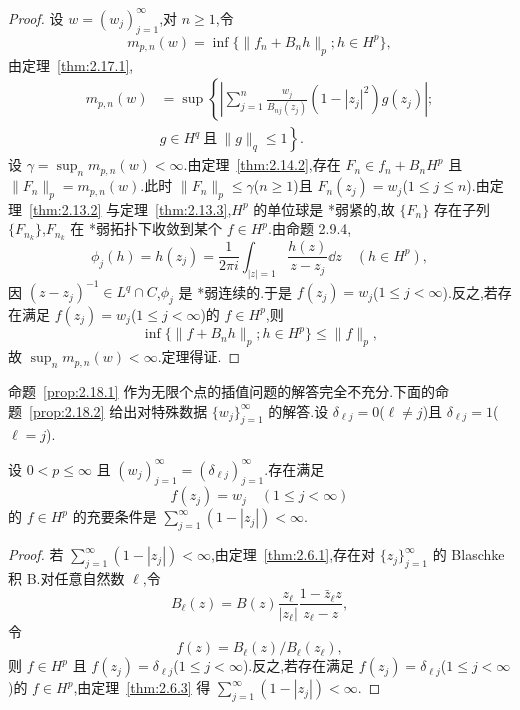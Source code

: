 \begin{proof}
设 $w = (w_{j})_{j=1}^{\infty}$,对 $n \geq 1$,令
\begin{equation*}
m_{p,n}(w) = \inf \{\|f_{n} + B_{n}h\|_{p}; h \in H^{p}\},
\end{equation*}
由定理~\ref{thm:2.17.1},
\begin{align*}
m_{p,n}(w) &= \sup \left\{\left| \sum_{j=1}^{n} \frac{w_{j}}{B_{nj}(z_{j})}(1 - |z_{j}|^{2}) g(z_{j}) \right|; \right. \\
& \left. g \in H^{q} \ \text{且} \ \|g\|_{q} \leq 1 \right\}.
\end{align*}
设 $\gamma = \sup_{n}m_{p,n}(w) < \infty$.由定理~\ref{thm:2.14.2},存在 $F_{n} \in f_{n} + B_{n}H^{p}$ 且 $\|F_{n}\|_{p} = m_{p,n}(w)$.此时 $\|F_{n}\|_{p} \leq \gamma$($n \geq 1$)且 $F_{n}(z_{j}) = w_{j}$($1 \leq j \leq n$).由定理~\ref{thm:2.13.2} 与定理~\ref{thm:2.13.3},$H^{p}$ 的单位球是 *弱紧的,故 $\{F_{n}\}$ 存在子列 $\{F_{n_{k}}\}$,$F_{n_{k}}$ 在 *弱拓扑下收敛到某个 $f \in H^{p}$.由命题 2.9.4,
\begin{equation*}
\phi_{j}(h) = h(z_{j}) = \frac{1}{2\pi i}\int_{|z|=1} \frac{h(z)}{z - z_{j}}\dd z \quad (h \in H^{p}),
\end{equation*}
因 $(z - z_{j})^{-1} \in L^{q} \cap C$,$\phi_{j}$ 是 *弱连续的.于是 $f(z_{j}) = w_{j}$($1 \leq j < \infty$).反之,若存在满足 $f(z_{j}) = w_{j}$($1 \leq j < \infty$)的 $f \in H^{p}$,则
\begin{equation*}
\inf \{\|f + B_{n}h\|_{p}; h \in H^{p}\} \leq \|f\|_{p},
\end{equation*}
故 $\sup_{n}m_{p,n}(w) < \infty$.定理得证.
\end{proof}

命题~\ref{prop:2.18.1} 作为无限个点的插值问题的解答完全不充分.下面的命题~\ref{prop:2.18.2} 给出对特殊数据 $\{w_{j}\}_{j=1}^{\infty}$ 的解答.设 $\delta_{\ell j} = 0$($\ell \neq j$)且 $\delta_{\ell j} = 1$($\ell = j$).

\begin{proposition}\label{prop:2.18.2}
设 $0 < p \leq \infty$ 且 $(w_{j})_{j=1}^{\infty} = (\delta_{\ell j})_{j=1}^{\infty}$.存在满足
\begin{equation*}
f(z_{j}) = w_{j} \quad (1 \leq j < \infty)
\end{equation*}
的 $f \in H^{p}$ 的充要条件是 $\sum_{j=1}^{\infty}(1 - |z_{j}|) < \infty$.
\end{proposition}

\begin{proof}
若 $\sum_{j=1}^{\infty}(1 - |z_{j}|) < \infty$,由定理~\ref{thm:2.6.1},存在对 $\{z_{j}\}_{j=1}^{\infty}$ 的 Blaschke 积 B.对任意自然数 $\ell$,令
\begin{equation*}
B_{\ell}(z) = B(z)\frac{z_{\ell}}{|z_{\ell}|}\frac{1 - \bar{z}_{\ell}z}{z_{\ell} - z},
\end{equation*}
令
\begin{equation*}
f(z) = B_{\ell}(z)/B_{\ell}(z_{\ell}),
\end{equation*}
则 $f \in H^{p}$ 且 $f(z_{j}) = \delta_{\ell j}$($1 \leq j < \infty$).反之,若存在满足 $f(z_{j}) = \delta_{\ell j}$($1 \leq j < \infty$)的 $f \in H^{p}$,由定理~\ref{thm:2.6.3} 得 $\sum_{j=1}^{\infty}(1 - |z_{j}|) < \infty$.
\end{proof}

